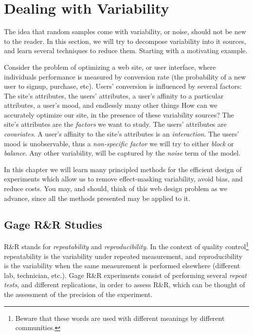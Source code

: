 \section{Dealing with Variability}
\label{sec:variance_components}

The idea that random samples come with variability, or noise, should not be new to the reader.
In this section, we will try to decompose variability into it sources, and learn several techniques to reduce them. 
Starting with a motivating example.



\begin{example}
\label{eg:variance_components}
Consider the problem of optimizing a web site, or user interface, where individuals performance is measured by conversion rate (the probability of a new user to signup, purchase, etc).
Users' conversion is influenced by several factors:
The site's attributes,
the users' attributes, 
a user's affinity to a particular attributes,  
a user's mood, 
and endlessly many other things
How can we accurately optimize our site, in the presence of these variability sources?
The site's attributes are the \emph{factors} we want to study.
The users' attributes are \emph{covariates}. 
A user's affinity to the site's attributes is an \emph{interaction}. 
The users' mood is unobservable, thus a \emph{non-specific factor} we will try to either \emph{block} or \emph{balance}.
Any other variability, will be captured by the \emph{noise} term of the model. 
\end{example}


In this chapter we will learn many principled methods for the efficient design of experiments which allow us to remove effect-masking variability, avoid bias, and reduce costs.
You may, and should, think of this web design problem as we advance, since all the methods presented may be applied to it.



\subsection{Gage R\&R Studies}
R\&R stands for \emph{repeatability} and \emph{reproducibility}.
In the context of quality control\footnote{Beware that these words are used with different meanings by different communities.} repeatability is the variability under repeated measurement, and reproducibility is the variability when the same measurement is performed elsewhere (different lab, technician, etc.).
Gage R\&R experiments consist of performing several \emph{repeat tests}, and different replications, in order to assess R\&R, which can be thought of the assessment of the precision of the experiment. 



